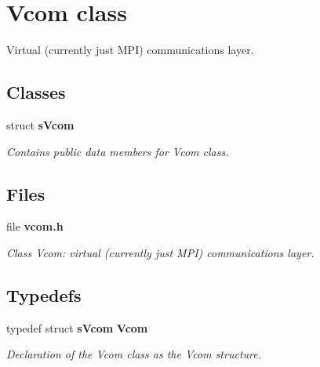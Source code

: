 \section{Vcom class}
\label{a00024}


Virtual (currently just MPI) communications layer.  


\subsection*{Classes}
\begin{DoxyCompactItemize}
\item 
struct {\bf sVcom}
\begin{DoxyCompactList}\small\item\em Contains public data members for Vcom class. \item\end{DoxyCompactList}\end{DoxyCompactItemize}
\subsection*{Files}
\begin{DoxyCompactItemize}
\item 
file {\bf vcom.h}


\begin{DoxyCompactList}\small\item\em Class Vcom: virtual (currently just MPI) communications layer. \item\end{DoxyCompactList}

\end{DoxyCompactItemize}
\subsection*{Typedefs}
\begin{DoxyCompactItemize}
\item 
typedef struct {\bf sVcom} {\bf Vcom}
\begin{DoxyCompactList}\small\item\em Declaration of the Vcom class as the Vcom structure. \item\end{DoxyCompactList}\end{DoxyCompactItemize}
